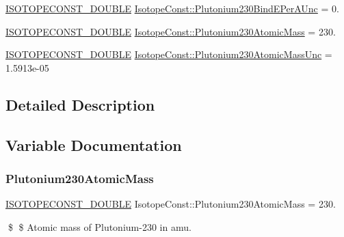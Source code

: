 \begin{DoxyCompactItemize}
\mbox{\hyperlink{group___isotope_const-_macros_ga8f45a7272ce02c0b4c65c44636ed719a}{I\+S\+O\+T\+O\+P\+E\+C\+O\+N\+S\+T\+\_\+\+D\+O\+U\+B\+LE}} \mbox{\hyperlink{group___isotope_const-_plutonium-_pu230_ga8803b7affe52ac0c9a71e90954436a2f}{Isotope\+Const\+::\+Plutonium230\+Bind\+E\+Per\+A\+Unc}} = 0.
\item 
\mbox{\hyperlink{group___isotope_const-_macros_ga8f45a7272ce02c0b4c65c44636ed719a}{I\+S\+O\+T\+O\+P\+E\+C\+O\+N\+S\+T\+\_\+\+D\+O\+U\+B\+LE}} \mbox{\hyperlink{group___isotope_const-_plutonium-_pu230_ga1bffaa6a0581ff7b828c6c7bfa0339a9}{Isotope\+Const\+::\+Plutonium230\+Atomic\+Mass}} = 230.
\item 
\mbox{\hyperlink{group___isotope_const-_macros_ga8f45a7272ce02c0b4c65c44636ed719a}{I\+S\+O\+T\+O\+P\+E\+C\+O\+N\+S\+T\+\_\+\+D\+O\+U\+B\+LE}} \mbox{\hyperlink{group___isotope_const-_plutonium-_pu230_ga444e3aa79157674708ec0b0d24c07f1e}{Isotope\+Const\+::\+Plutonium230\+Atomic\+Mass\+Unc}} = 1.\+5913e-\/05
\end{DoxyCompactItemize}


\subsection{Detailed Description}


\subsection{Variable Documentation}
\mbox{\label{group___isotope_const-_plutonium-_pu230_ga1bffaa6a0581ff7b828c6c7bfa0339a9}} 
\subsubsection{\texorpdfstring{Plutonium230\+Atomic\+Mass}{Plutonium230AtomicMass}}
{\footnotesize\ttfamily \mbox{\hyperlink{group___isotope_const-_macros_ga8f45a7272ce02c0b4c65c44636ed719a}{I\+S\+O\+T\+O\+P\+E\+C\+O\+N\+S\+T\+\_\+\+D\+O\+U\+B\+LE}} Isotope\+Const\+::\+Plutonium230\+Atomic\+Mass = 230.}

\$ \$ Atomic mass of Plutonium-\/230 in amu. \mbox{\label{group___isotope_const-_plutonium-_pu230_ga444e3aa79157674708ec0b0d24c07f1e}} 
